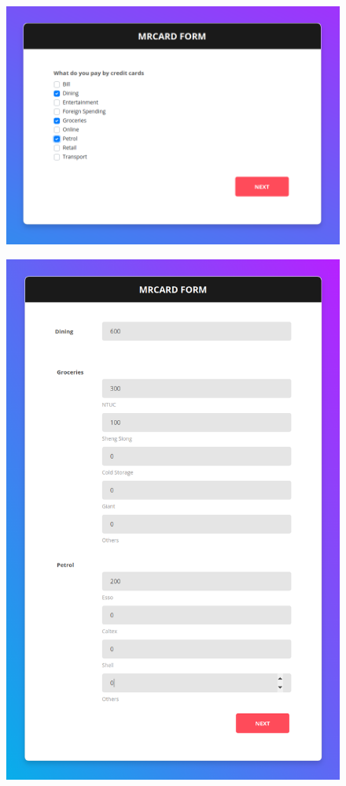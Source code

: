 		\begin{figure}[H]
			\centering
			\includegraphics[width=\linewidth]{img/scenario1_spending_checkbox.png}
		\end{figure}

		\begin{figure}[H]
			\centering
			\includegraphics[width=\linewidth]{img/scenario1_spending_amount.png}
		\end{figure}

